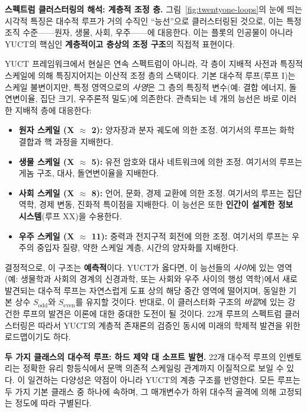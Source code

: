 \documentclass[12pt,a4paper]{article}
\begin{document}
	\vspace{0.5cm}
	\noindent
	\textbf{스펙트럼 클러스터링의 해석: 계층적 조정 층.}
	그림~\ref{fig:twentyone-loops}의 눈에 띄는 시각적 특징은 대수적 루프가 거의 수직인 ``능선''으로 클러스터링된 것으로, 이는 특정 조직 수준——원자, 생물, 사회, 우주——에 대응한다. 이는 플롯의 인공물이 아니라 YUCT의 핵심인 \textbf{계층적이고 층상의 조정 구조}의 직접적 표현이다.
	
	YUCT 프레임워크에서 현실은 연속 스펙트럼이 아니라, 각 층이 지배적 사전과 특징적 스케일에 의해 특징지어지는 이산적 조정 층의 스택이다. 기본 대수적 루프(루프 I)는 스케일 불변이지만, 특정 영역으로의 \textit{사영}은 그 층의 특징적 변수(예: 결합 에너지, 돌연변이율, 집단 크기, 우주론적 밀도)에 의존한다. 관측되는 네 개의 능선은 바로 이러한 지배적 층에 대응한다:
	\begin{itemize}
		\item \textbf{원자 스케일 (X $\approx$ 2):} 양자장과 분자 궤도에 의한 조정. 여기서의 루프는 화학 결합과 핵 과정을 지배한다.
		\item \textbf{생물 스케일 (X $\approx$ 5):} 유전 암호와 대사 네트워크에 의한 조정. 여기서의 루프는 게놈 구조, 대사, 돌연변이율을 지배한다.
		\item \textbf{사회 스케일 (X $\approx$ 8):} 언어, 문화, 경제 교환에 의한 조정. 여기서의 루프는 집단 역학, 경제 변동, 진화적 특이점을 지배한다. 이 능선은 또한 \textbf{인간이 설계한 정보 시스템}(루프 XX)을 수용한다.
		\item \textbf{우주 스케일 (X $\approx$ 11):} 중력과 전지구적 회전에 의한 조정. 여기서의 루프는 우주의 중입자 질량, 약한 스케일 계층, 시간의 양자화를 지배한다.
	\end{itemize}
	
	결정적으로, 이 구조는 \textbf{예측적}이다. YUCT가 옳다면, 이 능선들의 \textit{사이}에 있는 영역(예: 생물학과 사회의 경계의 신경과학, 또는 사회와 우주 사이의 행성 역학)에서 새로 발견되는 대수적 루프는 자연스럽게 도표 상의 해당 중간 영역에 떨어지며, 동일한 기본 상수 \(S_{\mathrm{odd}}\)와 \(S_{\mathrm{even}}\)를 유지할 것이다. 반대로, 이 클러스터화 구조의 \textit{바깥}에 있는 강건한 루프의 발견은 이론에 대한 중대한 도전이 될 것이다. 22개 루프의 스펙트럼 클러스터링은 따라서 YUCT의 계층적 존재론의 검증인 동시에 미래의 학제적 발견을 위한 로드맵이기도 하다.
	
	\vspace{0.5cm}
	\noindent
	\textbf{두 가지 클래스의 대수적 루프: 하드 제약 대 소프트 발현.}
	22개 대수적 루프의 인벤토리는 정확한 유리 항등식에서 문맥 의존적 스케일링 관계까지 이질적으로 보일 수 있다. 이 일견하는 다양성은 약점이 아니라 YUCT의 계층 구조를 반영한다. 모든 루프는 두 가지 기본 클래스 중 하나에 속하며, 그 매개변수가 하위 대수적 골격에 의해 고정되는 정도에 따라 구별된다.
	
\end{document}
